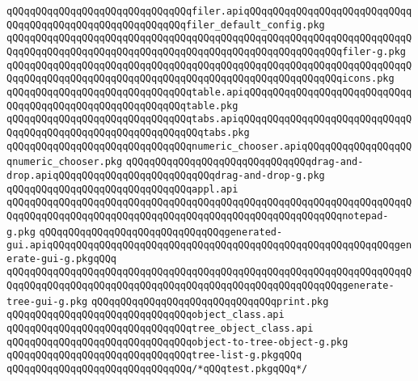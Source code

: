 \newline
\verb|qQQqqQQqqQQqqQQqqQQqqQQqqQQqqQQqfiler.apiqQQqqQQqqQQqqQQqqQQqqQQqqQQqqQQqqQQqqQQqqQQqqQQqqQQqqQQqqQQqfiler_default_config.pkg|\newline
\verb|qQQqqQQqqQQqqQQqqQQqqQQqqQQqqQQqqQQqqQQqqQQqqQQqqQQqqQQqqQQqqQQqqQQqqQQqqQQqqQQqqQQqqQQqqQQqqQQqqQQqqQQqqQQqqQQqqQQqqQQqqQQqqQQqfiler-g.pkg|\newline
\newline
\verb|qQQqqQQqqQQqqQQqqQQqqQQqqQQqqQQqqQQqqQQqqQQqqQQqqQQqqQQqqQQqqQQqqQQqqQQqqQQqqQQqqQQqqQQqqQQqqQQqqQQqqQQqqQQqqQQqqQQqqQQqqQQqqQQqicons.pkg|\newline
\newline
\verb|qQQqqQQqqQQqqQQqqQQqqQQqqQQqqQQqtable.apiqQQqqQQqqQQqqQQqqQQqqQQqqQQqqQQqqQQqqQQqqQQqqQQqqQQqqQQqqQQqtable.pkg|\newline
\verb|qQQqqQQqqQQqqQQqqQQqqQQqqQQqqQQqtabs.apiqQQqqQQqqQQqqQQqqQQqqQQqqQQqqQQqqQQqqQQqqQQqqQQqqQQqqQQqqQQqqQQqtabs.pkg|\newline
\verb|qQQqqQQqqQQqqQQqqQQqqQQqqQQqqQQqnumeric_chooser.apiqQQqqQQqqQQqqQQqqQQqnumeric_chooser.pkg|\newline
\newline
\verb|qQQqqQQqqQQqqQQqqQQqqQQqqQQqqQQqdrag-and-drop.apiqQQqqQQqqQQqqQQqqQQqqQQqqQQqdrag-and-drop-g.pkg|\newline
\newline
\verb|qQQqqQQqqQQqqQQqqQQqqQQqqQQqqQQqappl.api|\newline
\newline
\verb|qQQqqQQqqQQqqQQqqQQqqQQqqQQqqQQqqQQqqQQqqQQqqQQqqQQqqQQqqQQqqQQqqQQqqQQqqQQqqQQqqQQqqQQqqQQqqQQqqQQqqQQqqQQqqQQqqQQqqQQqqQQqqQQqnotepad-g.pkg|\newline
\verb|qQQqqQQqqQQqqQQqqQQqqQQqqQQqqQQqgenerated-gui.apiqQQqqQQqqQQqqQQqqQQqqQQqqQQqqQQqqQQqqQQqqQQqqQQqqQQqqQQqqQQqgenerate-gui-g.pkgqQQq|\newline
\verb|qQQqqQQqqQQqqQQqqQQqqQQqqQQqqQQqqQQqqQQqqQQqqQQqqQQqqQQqqQQqqQQqqQQqqQQqqQQqqQQqqQQqqQQqqQQqqQQqqQQqqQQqqQQqqQQqqQQqqQQqqQQqqQQqgenerate-tree-gui-g.pkg|\newline
\newline
\verb|qQQqqQQqqQQqqQQqqQQqqQQqqQQqqQQqprint.pkg|\newline
\verb|qQQqqQQqqQQqqQQqqQQqqQQqqQQqqQQqobject_class.api|\newline
\verb|qQQqqQQqqQQqqQQqqQQqqQQqqQQqqQQqtree_object_class.api|\newline
\verb|qQQqqQQqqQQqqQQqqQQqqQQqqQQqqQQqobject-to-tree-object-g.pkg|\newline
\verb|qQQqqQQqqQQqqQQqqQQqqQQqqQQqqQQqtree-list-g.pkgqQQq|\newline
\verb|qQQqqQQqqQQqqQQqqQQqqQQqqQQqqQQq/*qQQqtest.pkgqQQq*/|\newline

